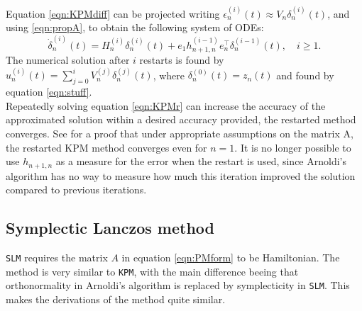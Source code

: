 \noindent Equation \eqref{eqn:KPMdiff} can be projected writing $ \epsilon^{(i)}_n(t)  \approx V_n \delta_n^{(i)}(t) $, and using \eqref{eqn:propA}, to obtain the following system of ODEs:
\begin{equation}
\dot{\delta}^{(i)}_n(t) = H_n^{(i)} \delta_n^{(i)}(t) + e_1 h_{n+1,n}^{(i-1)} e^\top_n \delta_n^{(i-1)}(t), \quad i \geq 1.
\label{eqn:KPMr}
\end{equation}
\noindent The numerical solution after $i$ restarts is found by $ u_n^{(i)}(t) = \sum \limits_{j = 0} ^i V_n^{(j)} \delta_n^{(j)} (t) $, where $\delta_n^{(0)} (t) = z_n(t)$ and found by equation \eqref{eqn:stuff}.\\%

\noindent Repeatedly solving equation \eqref{eqn:KPMr} can increase the accuracy of the approximated solution within a desired accuracy provided, the restarted method converges. See \cite{elenaconv} for a proof that under appropriate assumptions on the matrix A, the restarted KPM method converges even for $n=1$. It is no longer possible to use $h_{n+1,n}$ as a measure for the error when the restart is used, since Arnoldi's algorithm has no way to measure how much this iteration improved the solution compared to previous iterations.\\

\subsection{Symplectic Lanczos method} \label{sec:SLM}
\texttt{SLM} requires the matrix $A$ in equation \eqref{eqn:PMform} to be Hamiltonian. The method is very similar to \texttt{KPM}, with the main difference beeing that orthonormality in Arnoldi's algorithm is replaced by symplecticity in \texttt{SLM}. This makes the derivations of the method quite similar.\\

